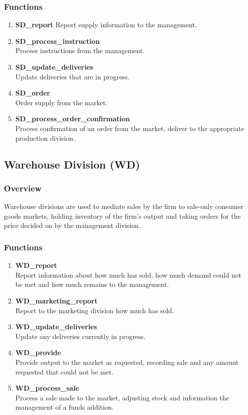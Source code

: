 \documentclass[11pt]{article}
\begin{document}
\subsubsection{Functions}
\begin{enumerate}
	\item \textbf{SD\_report}
	Report supply information to the management.
	\item \textbf{SD\_process\_instruction} \\
	Process instructions from the management.
	\item \textbf{SD\_update\_deliveries} \\
	Update deliveries that are in progress.
	\item \textbf{SD\_order} \\
	Order supply from the market.
	\item \textbf{SD\_process\_order\_confirmation} \\
	Process confirmation of an order from the market, deliver to the appropriate production division.
\end{enumerate}

\subsection{Warehouse Division (WD)}

\subsubsection{Overview}
Warehouse divisions are used to mediate sales by the firm to sale-only consumer goods markets, holding inventory of the firm's output and taking orders for the price decided on by the management division.

\subsubsection{Functions}
\begin{enumerate}
	\item \textbf{WD\_report} \\
	Report information about how much has sold, how much demand could not be met and how much remains to the management.
	\item \textbf{WD\_marketing\_report} \\
	Report to the marketing division how much has sold.
	\item \textbf{WD\_update\_deliveries} \\
	Update any deliveries currently in progress.
	\item \textbf{WD\_provide} \\
	Provide output to the market as requested, recording sale and any amount requested that could not be met.
	\item \textbf{WD\_process\_sale} \\
	Process a sale made to the market, adjusting stock and information the management of a funds addition.
\end{enumerate}
\end{document}
